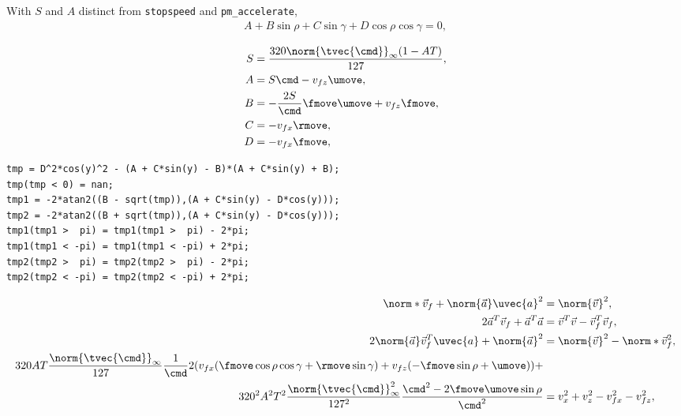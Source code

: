 With $S$ and $A$ distinct from \texttt{stopspeed} and \texttt{pm\_accelerate},
\begin{align}
\label{eq:ABCD}
A + B\sin\rho + C\sin\gamma + D\cos\rho\cos\gamma = 0,
\end{align}

\begin{align*}
S &= \frac{320\norm{\tvec{\cmd}}_{\infty}(1-AT)}{127},\\
A &= S\cmd         - v_{fz}\umove,\\
B &= -\frac{2S}{\cmd}\fmove\umove + v_{fz}\fmove,\\
C &= -v_{fx}\rmove,\\
D &= -v_{fx}\fmove,
\end{align*}

\begin{verbatim}
tmp = D^2*cos(y)^2 - (A + C*sin(y) - B)*(A + C*sin(y) + B);
tmp(tmp < 0) = nan;
tmp1 = -2*atan2((B - sqrt(tmp)),(A + C*sin(y) - D*cos(y)));
tmp2 = -2*atan2((B + sqrt(tmp)),(A + C*sin(y) - D*cos(y)));
tmp1(tmp1 >  pi) = tmp1(tmp1 >  pi) - 2*pi;
tmp1(tmp1 < -pi) = tmp1(tmp1 < -pi) + 2*pi;
tmp2(tmp2 >  pi) = tmp2(tmp2 >  pi) - 2*pi;
tmp2(tmp2 < -pi) = tmp2(tmp2 < -pi) + 2*pi;
\end{verbatim}

\begin{align*}
\norm*{\vec{v}_f + \norm{\vec{a}}\uvec{a}}^2 &= \norm{\vec{v}}^2,\\
2\vec{a}^T \vec{v}_f + \vec{a}^T \vec{a} &= \vec{v}^T \vec{v} - \vec{v}_f^T \vec{v}_f,\\
2\norm{\vec{a}} \vec{v}_f^T \uvec{a} + \norm{\vec{a}}^2 &= \norm{\vec{v}}^2 - \norm*{\vec{v}_f}^2,\\
320AT\frac{\norm{\tvec{\cmd}}_{\infty}}{127\hphantom{_{\infty}}} \frac{1}{\cmd}2 (v_{fx}(\fmove \cos\rho\cos\gamma + \rmove \sin\gamma) + v_{fz}(-\fmove \sin\rho + \umove) ) +\\
320^2 A^2 T^2\frac{\norm{\tvec{\cmd}}^2_{\infty}}{127^2\hphantom{_{\infty}}} \frac{\cmd^2  - 2\fmove\umove\sin\rho}{\cmd^2} &= v_x^2 + v_z^2 - v_{fx}^2 - v_{fz}^2,
\end{align*}

